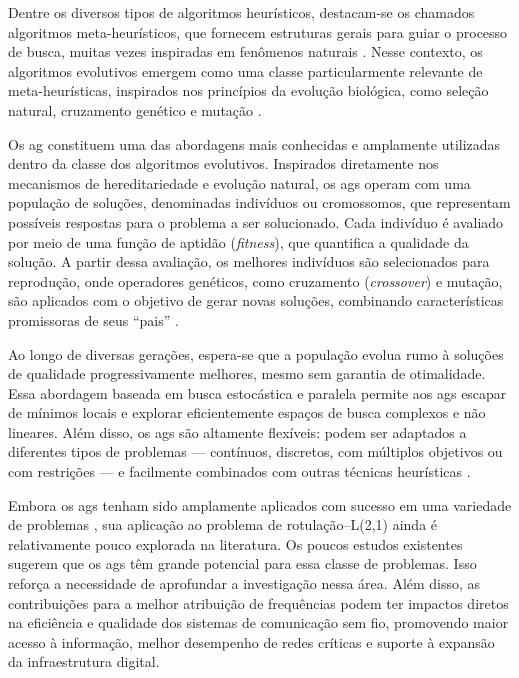 Dentre os diversos tipos de algoritmos heurísticos, destacam-se os chamados algoritmos meta-heurísticos, que fornecem estruturas gerais para guiar o processo de busca, muitas vezes inspiradas em fenômenos naturais \cite{Sörensen2013}. Nesse contexto, os algoritmos evolutivos emergem como uma classe particularmente relevante de meta-heurísticas, inspirados nos princípios da evolução biológica, como seleção natural, cruzamento genético e mutação \cite{eiben2015introduction}.

Os \gls{ag} constituem uma das abordagens mais conhecidas e amplamente utilizadas dentro da classe dos algoritmos evolutivos. Inspirados diretamente nos mecanismos de hereditariedade e evolução natural, os \gls{ag}s operam com uma população de soluções, denominadas indivíduos ou cromossomos, que representam possíveis respostas para o problema a ser solucionado. Cada indivíduo é avaliado por meio de uma função de aptidão (\textit{fitness}), que quantifica a qualidade da solução. A partir dessa avaliação, os melhores indivíduos são selecionados para reprodução, onde operadores genéticos, como cruzamento (\textit{crossover}) e mutação, são aplicados com o objetivo de gerar novas soluções, combinando características promissoras de seus “pais” \cite{goldberg1989genetic}.

Ao longo de diversas gerações, espera-se que a população evolua rumo à soluções de qualidade progressivamente melhores, mesmo sem garantia de otimalidade. Essa abordagem baseada em busca estocástica e paralela permite aos \gls{ag}s escapar de mínimos locais e explorar eficientemente espaços de busca complexos e não lineares. Além disso, os \gls{ag}s são altamente flexíveis: podem ser adaptados a diferentes tipos de problemas — contínuos, discretos, com múltiplos objetivos ou com restrições — e facilmente combinados com outras técnicas heurísticas \cite{eiben2015introduction}.

Embora os \gls{ag}s tenham sido amplamente aplicados com sucesso em uma variedade de problemas \cite{faia2018genetic, montana1989training, potvin1996genetic, zhang1997genetic}, sua aplicação ao problema de rotulação–L(2,1) ainda é relativamente pouco explorada na literatura. Os poucos estudos existentes sugerem que os \gls{ag}s têm grande potencial para essa classe de problemas. Isso reforça a necessidade de aprofundar a investigação nessa área. Além disso, as contribuições para a melhor atribuição de frequências podem ter impactos diretos na eficiência e qualidade dos sistemas de comunicação sem fio, promovendo maior acesso à informação, melhor desempenho de redes críticas e suporte à expansão da infraestrutura digital.   

